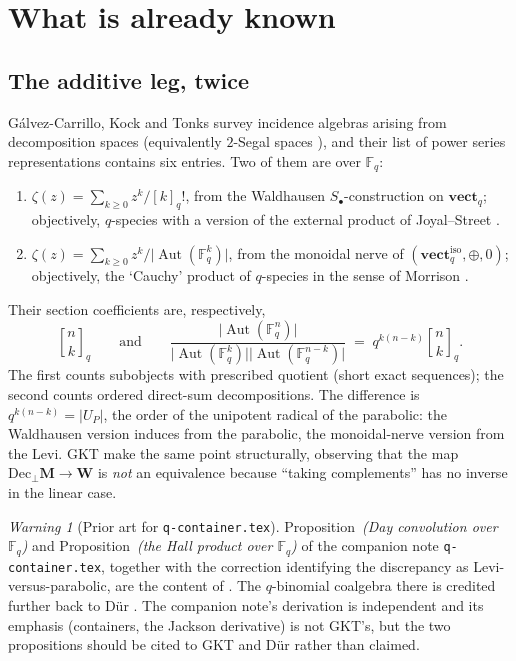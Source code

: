 \documentclass[11pt,a4paper]{article}
\theoremstyle{definition}
\theoremstyle{remark}
\newtheorem{warning}[theorem]{Warning}
\newcommand{\FF}{\mathbb{F}}
\newcommand{\cat}[1]{\mathbf{#1}}
\newcommand{\vect}{\cat{vect}}
\DeclareMathOperator{\Aut}{Aut}
\newcommand{\qbin}[2]{\genfrac{[}{]}{0pt}{}{#1}{#2}_{q}}
\newcommand{\norm}[1]{\lvert #1 \rvert}
\newcommand{\iso}{\mathrm{iso}}
\begin{document}
\section{What is already known}\label{sec:known}

\subsection{The additive leg, twice}

Gálvez-Carrillo, Kock and Tonks \cite{GKT-comb} survey incidence algebras arising from
decomposition spaces (equivalently $2$-Segal spaces \cite{DyckerhoffKapranov}), and their
list of power series representations contains six entries. Two of them are over $\FF_q$:

\begin{enumerate}[label=(\arabic*),start=5]
\item $\zeta(z) = \sum_{k \ge 0} z^k/[k]_q!$, from the Waldhausen $S_\bullet$-construction
on $\vect_q$; objectively, $q$-species with a version of the external product of
Joyal--Street \cite{JoyalStreet}.
\item $\zeta(z) = \sum_{k \ge 0} z^k/\norm{\Aut(\FF_q^k)}$, from the monoidal nerve of
$(\vect_q^{\iso},\oplus,0)$; objectively, the `Cauchy' product of $q$-species in the sense
of Morrison \cite{Morrison}.
\end{enumerate}

Their section coefficients are, respectively,
\[
  \qbin{n}{k}
  \qquad\text{and}\qquad
  \frac{\norm{\Aut(\FF_q^n)}}{\norm{\Aut(\FF_q^k)}\norm{\Aut(\FF_q^{n-k})}}
  \;=\; q^{k(n-k)}\qbin{n}{k}.
\]
The first counts subobjects with prescribed quotient (short exact sequences); the second
counts ordered direct-sum decompositions. The difference is $q^{k(n-k)} = \norm{U_P}$, the
order of the unipotent radical of the parabolic: the Waldhausen version induces from the
parabolic, the monoidal-nerve version from the Levi. GKT make the same point
structurally, observing that the map $\mathrm{Dec}_\bot \cat{M} \to \cat{W}$ is
\emph{not} an equivalence because ``taking complements'' has no inverse in the linear
case.

\begin{warning}[Prior art for \texttt{q-container.tex}]\label{warn:prior}
Proposition~\emph{(Day convolution over $\FF_q$)} and Proposition~\emph{(the Hall product
over $\FF_q$)} of the companion note \texttt{q-container.tex}, together with the
correction identifying the discrepancy as Levi-versus-parabolic, are the content of
\cite[\S{}Linear examples and the Waldhausen $S_\bullet$-construction]{GKT-comb}. The
$q$-binomial coalgebra there is credited further back to D\"ur \cite{Dur}. The companion
note's derivation is independent and its emphasis (containers, the Jackson derivative) is
not GKT's, but the two propositions should be cited to GKT and D\"ur rather than claimed.
\end{warning}
\end{document}

